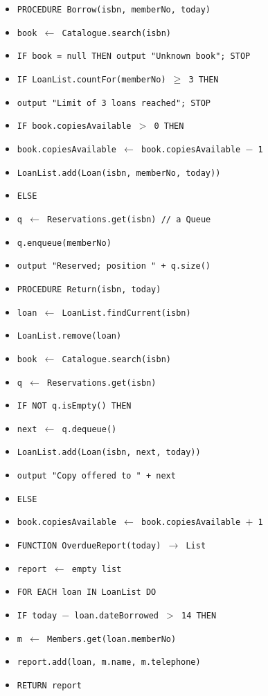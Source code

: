 \documentclass[11pt]{article}
\begin{document}
\begin{exemplebox}
\begin{itemize}
\item[] \texttt{PROCEDURE Borrow(isbn, memberNo, today)}
\item[] \texttt{\quad book $\leftarrow$ Catalogue.search(isbn)}
\item[] \texttt{\quad IF book = null THEN output "Unknown book"; STOP}
\item[] \texttt{\quad IF LoanList.countFor(memberNo) $\geq$ 3 THEN}
\item[] \texttt{\quad\quad output "Limit of 3 loans reached"; STOP}
\item[] \texttt{\quad IF book.copiesAvailable $>$ 0 THEN}
\item[] \texttt{\quad\quad book.copiesAvailable $\leftarrow$ book.copiesAvailable $-$ 1}
\item[] \texttt{\quad\quad LoanList.add(Loan(isbn, memberNo, today))}
\item[] \texttt{\quad ELSE}
\item[] \texttt{\quad\quad q $\leftarrow$ Reservations.get(isbn) \quad // a Queue}
\item[] \texttt{\quad\quad q.enqueue(memberNo)}
\item[] \texttt{\quad\quad output "Reserved; position " + q.size()}
\item[] \texttt{PROCEDURE Return(isbn, today)}
\item[] \texttt{\quad loan $\leftarrow$ LoanList.findCurrent(isbn)}
\item[] \texttt{\quad LoanList.remove(loan)}
\item[] \texttt{\quad book $\leftarrow$ Catalogue.search(isbn)}
\item[] \texttt{\quad q $\leftarrow$ Reservations.get(isbn)}
\item[] \texttt{\quad IF NOT q.isEmpty() THEN}
\item[] \texttt{\quad\quad next $\leftarrow$ q.dequeue()}
\item[] \texttt{\quad\quad LoanList.add(Loan(isbn, next, today))}
\item[] \texttt{\quad\quad output "Copy offered to " + next}
\item[] \texttt{\quad ELSE}
\item[] \texttt{\quad\quad book.copiesAvailable $\leftarrow$ book.copiesAvailable $+$ 1}
\item[] \texttt{FUNCTION OverdueReport(today) $\rightarrow$ List}
\item[] \texttt{\quad report $\leftarrow$ empty list}
\item[] \texttt{\quad FOR EACH loan IN LoanList DO}
\item[] \texttt{\quad\quad IF today $-$ loan.dateBorrowed $>$ 14 THEN}
\item[] \texttt{\quad\quad\quad m $\leftarrow$ Members.get(loan.memberNo)}
\item[] \texttt{\quad\quad\quad report.add(loan, m.name, m.telephone)}
\item[] \texttt{\quad RETURN report}
\end{itemize}
\end{exemplebox}
\end{document}
